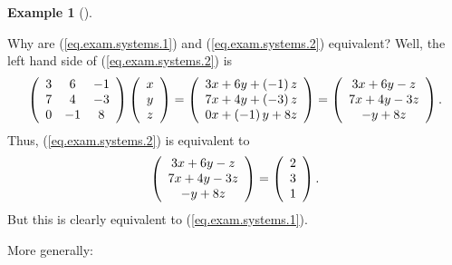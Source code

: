 \documentclass[numbers=enddot,12pt,final,onecolumn,notitlepage]{scrartcl}%
\theoremstyle{definition}
\newtheorem{exam}[theo]{Example}
\newenvironment{example}[1][]
{\begin{exam}[#1]\begin{leftbar}}
{\end{leftbar}\end{exam}}
\begin{document}
\begin{example}
Why are (\ref{eq.exam.systems.1}) and (\ref{eq.exam.systems.2}) equivalent?
Well, the left hand side of (\ref{eq.exam.systems.2}) is%
\[
\left(
\begin{array}
[c]{ccc}%
3 & 6 & -1\\
7 & 4 & -3\\
0 & -1 & 8
\end{array}
\right)  \left(
\begin{array}
[c]{c}%
x\\
y\\
z
\end{array}
\right)  =\left(
\begin{array}
[c]{c}%
3x+6y+\left(  -1\right)  z\\
7x+4y+\left(  -3\right)  z\\
0x+\left(  -1\right)  y+8z
\end{array}
\right)  =\left(
\begin{array}
[c]{c}%
3x+6y-z\\
7x+4y-3z\\
-y+8z
\end{array}
\right)  .
\]
Thus, (\ref{eq.exam.systems.2}) is equivalent to%
\[
\left(
\begin{array}
[c]{c}%
3x+6y-z\\
7x+4y-3z\\
-y+8z
\end{array}
\right)  =\left(
\begin{array}
[c]{c}%
2\\
3\\
1
\end{array}
\right)  .
\]
But this is clearly equivalent to (\ref{eq.exam.systems.1}).
\end{example}

More generally:
\end{document}
